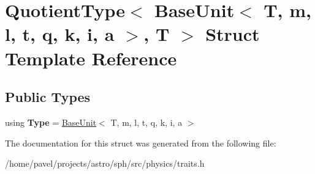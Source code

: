 \hypertarget{structQuotientType_3_01BaseUnit_3_01T_00_01m_00_01l_00_01t_00_01q_00_01k_00_01i_00_01a_01_4_00_01T_01_4}{}\section{Quotient\+Type$<$ Base\+Unit$<$ T, m, l, t, q, k, i, a $>$, T $>$ Struct Template Reference}
\label{structQuotientType_3_01BaseUnit_3_01T_00_01m_00_01l_00_01t_00_01q_00_01k_00_01i_00_01a_01_4_00_01T_01_4}
\subsection*{Public Types}
\begin{DoxyCompactItemize}
\item 
\hypertarget{structQuotientType_3_01BaseUnit_3_01T_00_01m_00_01l_00_01t_00_01q_00_01k_00_01i_00_01a_01_4_00_01T_01_4_a2fb21ddbc662ea769a610657393c92f3}{}\label{structQuotientType_3_01BaseUnit_3_01T_00_01m_00_01l_00_01t_00_01q_00_01k_00_01i_00_01a_01_4_00_01T_01_4_a2fb21ddbc662ea769a610657393c92f3} 
using {\bfseries Type} = \hyperlink{classBaseUnit}{Base\+Unit}$<$ T, m, l, t, q, k, i, a $>$
\end{DoxyCompactItemize}


The documentation for this struct was generated from the following file\+:\begin{DoxyCompactItemize}
\item 
/home/pavel/projects/astro/sph/src/physics/traits.\+h\end{DoxyCompactItemize}

